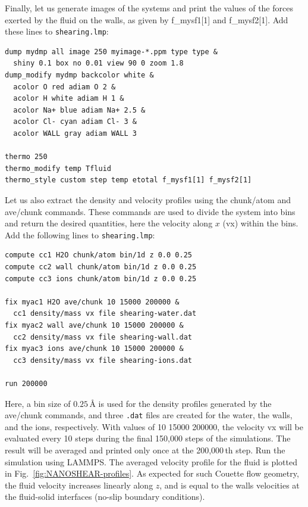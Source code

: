 \documentclass[9pt,tutorial]{livecoms}
\newcommand{\lmpcmd}[1]{\hspace{0pt}\colorbox{listing}{\textcolor{command}{\small{#1}}}\hspace{0pt}} %
\newcommand{\flecmd}[1]{\textcolor{command}{\texttt{#1}}} %
\begin{document}
Finally, let us generate images of the systems and print the values of the
forces exerted by the fluid on the walls, as given by \lmpcmd{f\_mysf1[1]}
and \lmpcmd{f\_mysf2[1]}.  Add these lines to \flecmd{shearing.lmp}:
\begin{lstlisting}
dump mydmp all image 250 myimage-*.ppm type type &
  shiny 0.1 box no 0.01 view 90 0 zoom 1.8
dump_modify mydmp backcolor white &
  acolor O red adiam O 2 &
  acolor H white adiam H 1 &
  acolor Na+ blue adiam Na+ 2.5 &
  acolor Cl- cyan adiam Cl- 3 &
  acolor WALL gray adiam WALL 3

thermo 250
thermo_modify temp Tfluid
thermo_style custom step temp etotal f_mysf1[1] f_mysf2[1]
\end{lstlisting}
Let us also extract the density and velocity profiles using
the \lmpcmd{chunk/atom} and \lmpcmd{ave/chunk} commands.  These commands are
used to divide the system into bins and return the desired quantities, here the velocity
along $x$ (\lmpcmd{vx}) within the bins.  Add the following lines to \flecmd{shearing.lmp}:
\begin{lstlisting}
compute cc1 H2O chunk/atom bin/1d z 0.0 0.25
compute cc2 wall chunk/atom bin/1d z 0.0 0.25
compute cc3 ions chunk/atom bin/1d z 0.0 0.25

fix myac1 H2O ave/chunk 10 15000 200000 &
  cc1 density/mass vx file shearing-water.dat
fix myac2 wall ave/chunk 10 15000 200000 &
  cc2 density/mass vx file shearing-wall.dat
fix myac3 ions ave/chunk 10 15000 200000 &
  cc3 density/mass vx file shearing-ions.dat

run 200000
\end{lstlisting}
Here, a bin size of $0.25\,\text{\AA{}}$ is used for the density profiles generated
by the \lmpcmd{ave/chunk} commands, and three \flecmd{.dat} files are created for
the water, the walls, and the ions, respectively.  With values of \lmpcmd{10 15000 200000},
the velocity \lmpcmd{vx} will be evaluated every 10 steps during the final 150,000
steps of the simulations.  The result will be averaged and printed only once at the 200,000\,th step.
Run the simulation using LAMMPS.  The averaged velocity
profile for the fluid is plotted in Fig.~\ref{fig:NANOSHEAR-profiles}.
As expected for such Couette flow geometry, the fluid velocity increases
linearly along $z$, and is equal to the walls velocities at the fluid-solid
interfaces (no-slip boundary conditions).
\end{document}
